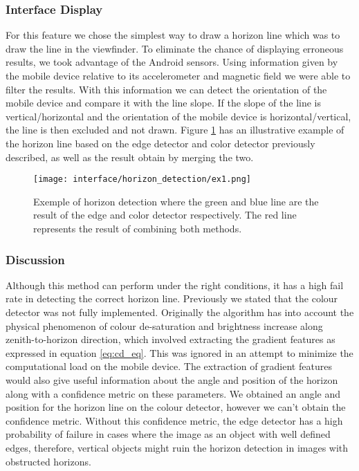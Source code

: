 \subsubsection{Interface Display}

For this feature we chose the simplest way to draw a horizon line which was to draw the line in the viewfinder. To eliminate the chance of displaying erroneous results, we took advantage of the Android sensors. Using information given by the mobile device relative to its accelerometer and magnetic field we were able to filter the results. With this information we can detect the orientation of the mobile device and compare it with the line slope. If the slope of the line is vertical/horizontal and the orientation of the mobile device is horizontal/vertical, the line is then excluded and not drawn. Figure \ref{fig:hori_ex} has an illustrative example of the horizon line based on the edge detector and color detector previously described, as well as the result obtain by merging the two.
\begin{figure}[htbp]
	\centering
    \texttt{[image: interface/horizon\_detection/ex1.png]}
    \caption{Exemple of horizon detection where the green and blue line are the result of the edge and color detector respectively. The red line represents the result of combining both methods.}
    \label{fig:hori_ex}
\end{figure}

\subsubsection{Discussion}

Although this method can perform under the right conditions, it has a high fail rate in detecting the correct horizon line. Previously we stated that the colour detector was not fully implemented. Originally the algorithm has into account the physical phenomenon of colour de-saturation and brightness increase along zenith-to-horizon direction, which involved extracting the gradient features as expressed in equation \ref{eq:cd_eq}. This was ignored in an attempt to minimize the computational load on the mobile device. 
The extraction of gradient features would also give useful information about the angle and position of the horizon along with a confidence metric on these parameters. We obtained an angle and position for the horizon line on the colour detector, however we can't obtain the confidence metric. Without this confidence metric, the edge detector has a high probability of failure in cases where the image as an object with well defined edges, therefore, vertical objects might ruin the horizon detection in images with obstructed horizons.

